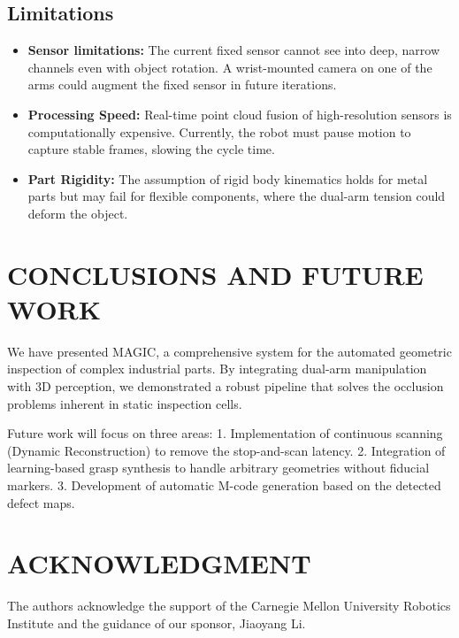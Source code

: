 \documentclass[letterpaper, 10 pt, conference]{ieeeconf}  %
\begin{document}
\subsection{Limitations}
\begin{itemize}
    \item \textbf{Sensor limitations:} The current fixed sensor cannot see into deep, narrow channels even with object rotation. A wrist-mounted camera on one of the arms could augment the fixed sensor in future iterations.
    \item \textbf{Processing Speed:} Real-time point cloud fusion of high-resolution sensors is computationally expensive. Currently, the robot must pause motion to capture stable frames, slowing the cycle time.
    \item \textbf{Part Rigidity:} The assumption of rigid body kinematics holds for metal parts but may fail for flexible components, where the dual-arm tension could deform the object.
\end{itemize}

\section{CONCLUSIONS AND FUTURE WORK}

We have presented MAGIC, a comprehensive system for the automated geometric inspection of complex industrial parts. By integrating dual-arm manipulation with 3D perception, we demonstrated a robust pipeline that solves the occlusion problems inherent in static inspection cells.

Future work will focus on three areas:
1. Implementation of continuous scanning (Dynamic Reconstruction) to remove the stop-and-scan latency.
2. Integration of learning-based grasp synthesis to handle arbitrary geometries without fiducial markers.
3. Development of automatic M-code generation based on the detected defect maps.

\section*{ACKNOWLEDGMENT}
The authors acknowledge the support of the Carnegie Mellon University Robotics Institute and the guidance of our sponsor, Jiaoyang Li.




\end{document}
